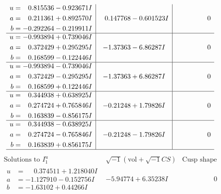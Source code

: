 \documentclass[1p]{elsarticle_modified}
\theoremstyle{definition}
\newcommand{\I}{\sqrt{-1}}
\begin{document}
$$\begin{array}{c|c|c}
\begin{aligned}
u &= \phantom{-}0.815536 - 0.923671 I \\
a &= \phantom{-}0.211361 + 0.892570 I \\
b &= -0.292264 - 0.219911 I\end{aligned}
 & \phantom{-}0.147768 - 0.601523 I & \phantom{-0.000000 } 0 \\ \hline\begin{aligned}
u &= -0.993894 + 0.739046 I \\
a &= \phantom{-}0.372429 + 0.295295 I \\
b &= \phantom{-}0.168599 - 0.122446 I\end{aligned}
 & -1.37363 - 6.86287 I & \phantom{-0.000000 } 0 \\ \hline\begin{aligned}
u &= -0.993894 - 0.739046 I \\
a &= \phantom{-}0.372429 - 0.295295 I \\
b &= \phantom{-}0.168599 + 0.122446 I\end{aligned}
 & -1.37363 + 6.86287 I & \phantom{-0.000000 } 0 \\ \hline\begin{aligned}
u &= \phantom{-}0.344938 + 0.638925 I \\
a &= \phantom{-}0.274724 + 0.765846 I \\
b &= \phantom{-}0.163839 - 0.856175 I\end{aligned}
 & -0.21248 + 1.79826 I & \phantom{-0.000000 } 0 \\ \hline\begin{aligned}
u &= \phantom{-}0.344938 - 0.638925 I \\
a &= \phantom{-}0.274724 - 0.765846 I \\
b &= \phantom{-}0.163839 + 0.856175 I\end{aligned}
 & -0.21248 - 1.79826 I & \phantom{-0.000000 } 0\\
 \hline 
 \end{array}$$\newpage$$\begin{array}{c|c|c}  
\text{Solutions to }I^u_{1}& \I (\text{vol} + \sqrt{-1}CS) & \text{Cusp shape}\\
 \hline 
\begin{aligned}
u &= \phantom{-}0.374511 + 1.218040 I \\
a &= -1.127910 - 0.152756 I \\
b &= -1.63102 + 0.44266 I\end{aligned}
 & -5.94774 + 6.35238 I & \phantom{-0.000000 } 0 \\ \hline\begin{aligned}

\end{aligned}
\end{array}$$
\end{document}
